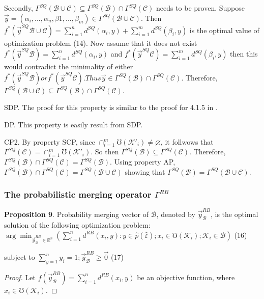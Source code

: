 \documentclass[]{iosart2c}
\begin{document}
  Secondly, $\Gamma^{SQ}(\mathcal{B} \cup \mathcal{C}) \subseteq \Gamma^{SQ}(\mathcal{B}) \cap \Gamma^{SQ}(\mathcal{C})$ needs to be proven. Suppose $\vec{y} = (\alpha_i, ..., \alpha_n, \beta1, ..., \beta_m) \in \Gamma^{SQ}(\mathcal{B} \cup \mathcal{C})$. Then $f^*(\vec{y}^{SQ}\mathcal{B}\cup\mathcal{C})=\sum^n_{i=1} d^{SQ} (\alpha_i, y) +\sum^m_{i=1} d^{SQ}(\beta_i, y)$ is the optimal value of optimization problem (14). Now assume that it does not exist $f^*(\vec{y}^{SQ}\mathcal{B} ) = \sum^n_{i=1} d^{SQ}(\alpha_i, y)$ and $f^*(\vec{y}^{SQ}\mathcal{C} ) = \sum^m_{i=1} d^{SQ}(\beta_i, y)$ then this would contradict the minimality of either $f^*(\vec{y}^{SQ}\mathcal{B} ) or f^*(\vec{y}^{SQ}\mathcal{C} ). Thus \vec{y} \in \Gamma^{SQ}(\mathcal{B}) \cap \Gamma^{SQ}(\mathcal{C})$. Therefore, $\Gamma^{SQ}(\mathcal{B} \cup \mathcal{C}) \subseteq \Gamma^{SQ}(\mathcal{B}) \cap \Gamma^{SQ}(\mathcal{C})$.

  SDP. The proof for this property is similar to the proof for 4.1.5 in \cite{23}.

  DP. This property is easily result from SDP.

  CP2. By property SCP, since $\cap^m_{i=1}\mho(\mathcal{K}'_i) \neq \varnothing$,
  it follwows that $\Gamma^{SQ}(\mathcal{C}) = \cap^m_{i=1}\mho(\mathcal{K}'_i)$. So then
  $\Gamma^{SQ}(\mathcal{B}) \subseteq \Gamma^{SQ}(\mathcal{C})$. Therefore, $\Gamma^{SQ}(\mathcal{B}) \cap \Gamma^{SQ}(\mathcal{C}) =
  \Gamma^{SQ}(\mathcal{B})$. Using property AP, $\Gamma^{SQ}(\mathcal{B}) \cap \Gamma^{SQ}(\mathcal{C}) = \Gamma^{SQ}(\mathcal{B} \cup \mathcal{C})$
  showing that $\Gamma^{SQ}(\mathcal{B}) = \Gamma^{SQ}(\mathcal{B} \cup \mathcal{C})$.

  \subsubsection{The probabilistic merging operator $\Gamma ^{RB}$}
  \textbf{Proposition 9}. Probability merging vector of $\mathcal{B}$,
  denoted by $\vec{y}^{RB}_\mathcal{B}$, is the optimal solution of the following optimization problem:
  $\arg \min_{\vec{y}^{RB}_\mathcal{B} \in \mathbb{R}^n} \left( \sum^n_{i=1} d^{RB}(x_i, y) :
  y \in \hat{p}(\hat{\varepsilon}); x_i \in \mho(\mathcal{K}_i);\mathcal{K}_i \in \mathcal{B} \right)$  (16)

  subject to $\sum^n_{y=1} y_i= 1; \vec{y}^{RB}_\mathcal{B} \geq \vec{0}$ (17)

  \begin{proof}
    Let $f(\vec{y}^{RB}_\mathcal{B}) = \sum^n_{i=1} d^{RB}(x_i,y)$ be an objective function, where $x_i \in \mho(\mathcal{K}_i)$.
  \end{proof}
\end{document}
